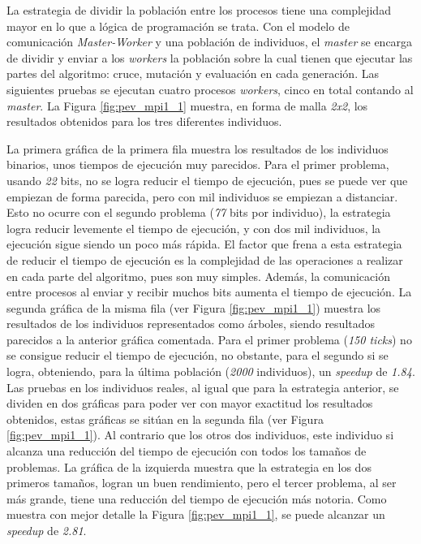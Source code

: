 		
		\newpage
		
		
	
		La estrategia de dividir la población entre los procesos tiene una complejidad mayor en lo que a lógica de programación se trata. Con el modelo de comunicación \textit{Master-Worker} y una población de individuos, el \textit{master} se encarga de dividir y enviar a los \textit{workers} la población sobre la cual tienen que ejecutar las partes del algoritmo: cruce, mutación y evaluación en cada generación. Las siguientes pruebas se ejecutan cuatro procesos \textit{workers}, cinco en total contando al \textit{master}. La Figura \ref{fig:pev_mpi1_1} muestra, en forma de malla \textit{2x2}, los resultados obtenidos para los tres diferentes individuos. 
		
		La primera gráfica de la primera fila muestra los resultados de los individuos binarios, unos tiempos de ejecución muy parecidos. Para el primer problema, usando \textit{22} bits, no se logra reducir el tiempo de ejecución, pues se puede ver que empiezan de forma parecida, pero con mil individuos se empiezan a distanciar. Esto no ocurre con el segundo problema (\textit{77} bits por individuo), la estrategia logra reducir levemente el tiempo de ejecución, y con dos mil individuos, la ejecución sigue siendo un poco más rápida. El factor que frena a esta estrategia de reducir el tiempo de ejecución es la complejidad de las operaciones a realizar en cada parte del algoritmo, pues son muy simples. Además, la comunicación entre procesos al enviar y recibir muchos bits aumenta el tiempo de ejecución. La segunda gráfica de la misma fila (ver Figura \ref{fig:pev_mpi1_1}) muestra los resultados de los individuos representados como árboles, siendo resultados parecidos a la anterior gráfica comentada. Para el primer problema (\textit{150 ticks}) no se consigue reducir el tiempo de ejecución, no obstante, para el segundo si se logra, obteniendo, para la última población (\textit{2000} individuos), un \textit{speedup} de \textit{1.84}. Las pruebas en los individuos reales, al igual que para la estrategia anterior, se dividen en dos gráficas para poder ver con mayor exactitud los resultados obtenidos, estas gráficas se sitúan en la segunda fila (ver Figura \ref{fig:pev_mpi1_1}). Al contrario que los otros dos individuos, este individuo si alcanza una reducción del tiempo de ejecución con todos los tamaños de problemas. La gráfica de la izquierda muestra que la estrategia en los dos primeros tamaños, logran un buen rendimiento, pero el tercer problema, al ser más grande, tiene una reducción del tiempo de ejecución más notoria. Como muestra con mejor detalle la Figura \ref{fig:pev_mpi1_1}, se puede alcanzar un \textit{speedup} de \textit{2.81}.
		
